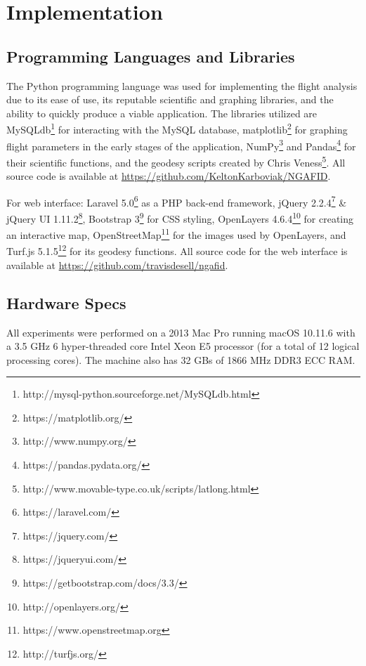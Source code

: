 \chapter{Implementation} \label{ch:implementation}

\section{Programming Languages and Libraries}

	The Python programming language was used for implementing the flight analysis due to its ease of use, its reputable scientific and graphing libraries, and the ability to quickly produce a viable application.  The libraries utilized are MySQLdb\footnote{http://mysql-python.sourceforge.net/MySQLdb.html} for interacting with the MySQL database, matplotlib\footnote{https://matplotlib.org/} for graphing flight parameters in the early stages of the application, NumPy\footnote{http://www.numpy.org/} and Pandas\footnote{https://pandas.pydata.org/} for their scientific functions, and the geodesy scripts created by Chris Veness\footnote{http://www.movable-type.co.uk/scripts/latlong.html}.  All source code is available at \url{https://github.com/KeltonKarboviak/NGAFID}.
    
    For web interface: Laravel 5.0\footnote{https://laravel.com/} as a PHP back-end framework, jQuery 2.2.4\footnote{https://jquery.com/} \& jQuery UI 1.11.2\footnote{https://jqueryui.com/}, Bootstrap 3\footnote{https://getbootstrap.com/docs/3.3/} for CSS styling, OpenLayers 4.6.4\footnote{http://openlayers.org/} for creating an interactive map, OpenStreetMap\footnote{https://www.openstreetmap.org} for the images used by OpenLayers, and Turf.js 5.1.5\footnote{http://turfjs.org/} for its geodesy functions.  All source code for the web interface is available at \url{https://github.com/travisdesell/ngafid}.


\section{Hardware Specs}

	All experiments were performed on a 2013 Mac Pro running macOS 10.11.6 with a 3.5 GHz 6 hyper-threaded core Intel Xeon E5 processor (for a total of 12 logical processing cores). The machine also has 32 GBs of 1866 MHz DDR3 ECC RAM.


